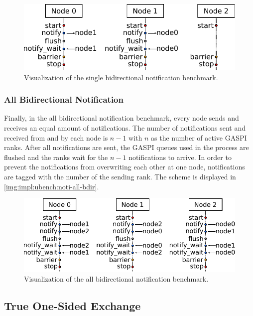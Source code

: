\begin{figure}[htb]
\centering
\includegraphics[width=\textwidth]{img/bench-noti-single-bdir}
\caption{Visualization of the single bidirectional notification benchmark.}
\label{img:impl:ubench:noti-single-bdir}
\end{figure}

\subsubsection*{All Bidirectional Notification}

Finally, in the all bidirectional notification benchmark, every node sends and receives an equal amount of notifications. The number of notifications sent and received from and by each node is $n-1$ with $n$ as the number of active \ac{GASPI} ranks. After all notifications are sent, the  \ac{GASPI} queues used in the process are flushed and the ranks wait for the $n-1$ notifications to arrive. In order to prevent the notifications from overwriting each other at one node, notifications are tagged with the number of the sending rank. The scheme is displayed in \autoref{img:impl:ubench:noti-all-bdir}.

\begin{figure}[htb]
\centering
\includegraphics[width=\textwidth]{img/bench-noti-all-bdir}
\caption{Visualization of the all bidirectional notification benchmark.}
\label{img:impl:ubench:noti-all-bdir}
\end{figure}

\subsection{True One-Sided Exchange}

